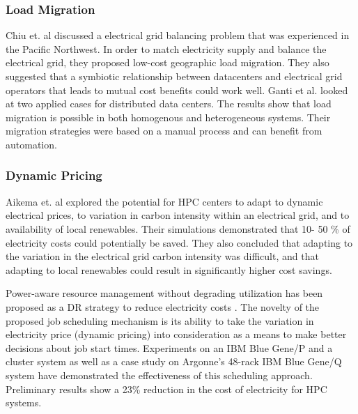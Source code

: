 \subsubsection{Load Migration}
Chiu et. al \cite{chiu_electric_2012} discussed a electrical grid balancing problem that was experienced in the Pacific Northwest. In order to match electricity supply and balance the electrical grid, they proposed low-cost geographic load migration. They also suggested that a symbiotic relationship between datacenters and electrical grid operators that leads to mutual cost benefits could work well.  Ganti et al. \cite{Ghatikar2012b} looked at two applied cases for distributed data centers. The results show that load migration is possible in both homogenous and heterogeneous systems. Their migration strategies were based on a manual process and can benefit from automation.

\subsubsection{Dynamic Pricing}
Aikema et. al \cite{aikema_electrical_2011} explored the potential for HPC centers to adapt to dynamic electrical prices, to variation in carbon intensity within an electrical grid, and to availability of local renewables. Their simulations demonstrated that 10- 50 \% of electricity costs could potentially be saved. They also concluded that adapting to the variation in the electrical grid carbon intensity was difficult, and that adapting to local renewables could result in significantly higher cost savings.

Power-aware resource management without degrading utilization has been proposed as a DR strategy to reduce electricity costs \cite{yang_integrating_2013,zhou_reducing_2013}. The novelty of the proposed job scheduling mechanism is its ability to take the variation in electricity price (dynamic pricing) into consideration as a means to make better decisions about job start times. Experiments on an IBM Blue Gene/P and a cluster system as well as a case study on Argonne's 48-rack IBM Blue Gene/Q system have demonstrated the effectiveness of this scheduling approach. Preliminary results show a 23\% reduction in the cost of electricity for HPC systems.
